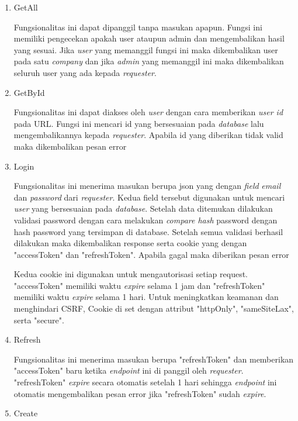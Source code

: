 \begin{enumerate}
  \item GetAll

        Fungsionalitas ini dapat dipanggil tanpa masukan apapun. Fungsi ini memiliki pengecekan apakah user ataupun admin dan mengembalikan hasil yang sesuai. Jika \textit{user} yang memanggil fungsi ini maka dikembalikan user pada satu \textit{company} dan jika \textit{admin} yang memanggil ini maka dikembalikan seluruh user yang ada kepada \textit{requester}.

  \item GetById

        Fungsionalitas ini dapat diakses oleh \textit{user} dengan cara memberikan \textit{user id} pada URL. Fungsi ini mencari id yang bersesuaian pada \textit{database} lalu mengembalikannya kepada \textit{requester}. Apabila id yang diberikan tidak valid maka dikembalikan pesan error

  \item Login

        Fungsionalitas ini menerima masukan berupa json yang dengan \textit{field} \textit{email} dan \textit{password} dari \textit{requester}. Kedua field tersebut digunakan untuk mencari \textit{user} yang bersesuaian pada \textit{database}. Setelah data ditemukan dilakukan validasi password dengan cara melakukan \textit{compare hash} password dengan hash password yang tersimpan di database. Setelah semua validasi berhasil dilakukan maka dikembalikan response serta cookie yang dengan "accessToken" dan "refreshToken". Apabila gagal maka diberikan pesan error

        Kedua cookie ini digunakan untuk mengautorisasi setiap request. "accessToken" memiliki waktu \textit{expire} selama 1 jam dan "refreshToken" memiliki waktu \textit{expire} selama 1 hari. Untuk meningkatkan keamanan dan menghindari CSRF, Cookie di set dengan attribut "httpOnly", "sameSiteLax", serta "secure".

  \item Refresh

        Fungsionalitas ini menerima masukan berupa "refreshToken" dan memberikan "accessToken" baru ketika \textit{endpoint} ini di panggil oleh \textit{requester}. "refreshToken" \textit{expire} secara otomatis setelah 1 hari sehingga \textit{endpoint} ini otomatis mengembalikan pesan error jika "refreshToken" sudah \textit{expire}.

  \item Create


\end{enumerate}
